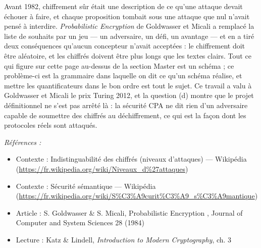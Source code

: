 \documentclass[11pt]{article}
\newenvironment{refs}{\par\small\noindent\emph{Références :}\begin{itemize}\setlength\itemsep{0pt}}{\end{itemize}\normalsize}
\begin{document}
\noindent Avant 1982, \og{} chiffrement sûr \fg{} était une description de ce qu'une attaque
devait échouer à faire, et chaque proposition tombait sous une attaque que nul n'avait pensé
à interdire. \textit{Probabilistic Encryption} de Goldwasser et Micali a remplacé la liste de
souhaits par un jeu --- un adversaire, un défi, un avantage --- et en a tiré deux conséquences
qu'aucun concepteur n'avait acceptées : le chiffrement doit être aléatoire, et les chiffrés
doivent être plus longs que les textes clairs. Tout ce qui figure sur cette page au-dessus de
la section Master est un schéma ; ce problème-ci est la grammaire dans laquelle on dit ce
qu'un schéma réalise, et mettre les quantificateurs dans le bon ordre est tout le sujet. Ce
travail a valu à Goldwasser et Micali le prix Turing 2012, et la question (d) montre que le
projet définitionnel ne s'est pas arrêté là : la sécurité CPA ne dit rien d'un adversaire
capable de soumettre des chiffrés au déchiffrement, ce qui est la façon dont les protocoles
réels sont attaqués.

\begin{refs}
\item Contexte : Indistinguabilité des chiffrés (niveaux d'attaques) --- Wikipédia (\url{https://fr.wikipedia.org/wiki/Niveaux_d%27attaques})
\item Contexte : Sécurité sémantique --- Wikipédia (\url{https://fr.wikipedia.org/wiki/S%C3%A9curit%C3%A9_s%C3%A9mantique})
\item Article : S. Goldwasser \& S. Micali, \og{} Probabilistic Encryption \fg{}, Journal of Computer and System Sciences 28 (1984)
\item Lecture : Katz \& Lindell, \textit{Introduction to Modern Cryptography}, ch. 3
\end{refs}

\bigskip
\end{document}
